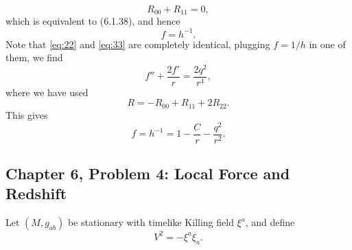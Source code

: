 \begin{enumerate}[label=\alph*)]
\begin{solution}
\begin{equation}
            R_{00} + R_{11} = 0,
        \end{equation}
        which is equivalent to (6.1.38), and hence
        \begin{equation}
            f = h^{-1}.
        \end{equation}
        Note that \eqref{eq:22} and \eqref{eq:33} are completely identical, plugging $f=1/h$ in one of them, we find
        \begin{equation}
            f''  + \frac{2f'}{r}= \frac{2q^2}{r^4},
        \end{equation}
        where we have used
        \begin{equation}
            R = -R_{00} + R_{11} + 2R_{22}.
        \end{equation}
        This gives
        \begin{equation}
            f = h^{-1} = 1- \frac{C}{r} -\frac{q^2}{r^2}.
        \end{equation}


    \end{solution}
\end{enumerate}

\subsection{Chapter 6, Problem 4: Local Force and Redshift}

Let $(M,g_{ab})$ be stationary with timelike Killing field $\xi^a$, and define
\begin{equation}
    V^2=-\xi^a\xi_a.
\end{equation}

